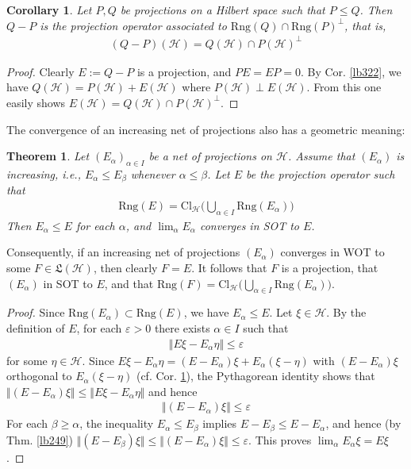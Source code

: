 \documentclass[12pt,b5paper,notitlepage]{article}
\theoremstyle{definition}
\theoremstyle{plain}
\newtheorem{thm}[df]{Theorem}
\newtheorem{co}[df]{Corollary}
\newcommand{\fk}{\mathfrak}
\newcommand{\Rng}{\mathrm{Rng}}
\newcommand{\Cl}{\mathrm{Cl}}
\newcommand{\eps}{\varepsilon}
\newcommand{\MH}{\mathcal H}
\numberwithin{equation}{section}
\begin{document}
\begin{co}\label{lb263}
Let $P,Q$ be projections on a Hilbert space such that $P\leq Q$. Then $Q-P$ is the projection operator associated to $\Rng(Q)\cap\Rng(P)^\perp$, that is,
\begin{align*}
(Q-P)(\MH)=Q(\MH)\cap P(\MH)^\perp
\end{align*}
\end{co}

\begin{proof}
Clearly $E:=Q-P$ is a projection, and $PE=EP=0$. By Cor. \ref{lb322}, we have $Q(\MH)=P(\MH)+E(\MH)$ where $P(\MH)\perp E(\MH)$. From this one easily shows $E(\MH)=Q(\MH)\cap P(\MH)^\perp$.
\end{proof}


The convergence of an increasing net of projections also has a geometric meaning:

\begin{thm}\label{lb264}
Let $(E_\alpha)_{\alpha\in I}$ be a net of projections on $\MH$. Assume that $(E_\alpha)$ is increasing, i.e., $E_\alpha\leq E_\beta$ whenever $\alpha\leq\beta$. Let $E$ be the projection operator such that
\begin{align}
\Rng(E)=\Cl_\MH\Big(\bigcup_{\alpha\in I}\Rng(E_\alpha)\Big)
\end{align}
Then $E_\alpha\leq E$ for each $\alpha$, and $\lim_\alpha E_\alpha$ converges in SOT to $E$.
\end{thm}

Consequently, if an increasing net of projections $(E_\alpha)$ converges in WOT to some $F\in\fk L(\MH)$, then clearly $F=E$. It follows that $F$ is a projection, that $(E_\alpha)$ in SOT to $E$, and that $\Rng(F)=\Cl_\MH\big(\bigcup_{\alpha\in I}\Rng(E_\alpha)\big)$.

\begin{proof}
Since $\Rng(E_\alpha)\subset\Rng(E)$, we have $E_\alpha\leq E$. Let $\xi\in\MH$. By the definition of $E$, for each $\eps>0$ there exists $\alpha\in I$ such that
\begin{align*}
\Vert E\xi-E_\alpha\eta\Vert\leq\eps
\end{align*}
for some $\eta\in\MH$. Since $E\xi-E_\alpha\eta=(E-E_\alpha)\xi+E_\alpha(\xi-\eta)$ with $(E-E_\alpha)\xi$ orthogonal to $E_\alpha(\xi-\eta)$ (cf. Cor. \ref{lb263}), the Pythagorean identity shows that $\Vert(E-E_\alpha)\xi\Vert\leq\Vert E\xi-E_\alpha\eta\Vert$ and hence
\begin{align*}
\Vert (E-E_\alpha)\xi\Vert\leq\eps
\end{align*}
For each $\beta\geq\alpha$, the inequality $E_\alpha\leq E_\beta$ implies $E-E_\beta\leq E-E_\alpha$, and hence (by Thm. \ref{lb249}) $\Vert (E-E_\beta)\xi\Vert\leq\Vert (E-E_\alpha)\xi\Vert\leq\eps$. This proves $\lim_\alpha E_\alpha\xi=E\xi$.
\end{proof}
\end{document}
